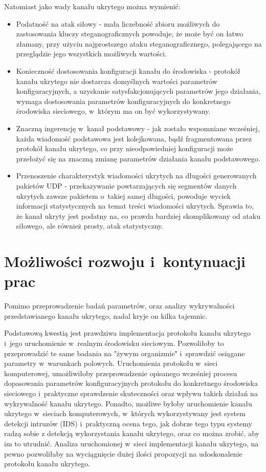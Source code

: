 \documentclass[a4paper, twoside, 12pt]{report}
\begin{document}
    Natomiast jako wady kanału ukrytego można wymienić:
    \begin{itemize}
        \item Podatność na atak siłowy - mała liczebność zbioru możliwych do zastosowania
            kluczy steganograficznych powoduje, że może być on łatwo złamany,
            przy użyciu najprostszego ataku steganograficznego, polegającego
            na przeglądzie jego wszystkich możliwych wartości.
        \item Konieczność dostosowania konfiguracji kanału do środowiska - protokół
            kanału ukrytego nie dostarcza domyślnych wartości parametrów konfiguracyjnych, a
            uzyskanie satysfakcjonujących parametrów jego działania, wymaga dostosowania
            parametrów konfiguracyjnych do konkretnego środowiska sieciowego,
            w~którym ma on być wykorzystywany.
        \item Znaczną ingerencję w~kanał podstawowy - jak zostało wspomniane wcześniej,
            każda wiadomość podstawowa jest kolejkowana, bądź fragmentowana przez
            protokół kanału ukrytego, co przy nieodpowiedniej konfiguracji może
            przełożyć się na znaczną zmianę parametrów działania kanału podstawowego.
        \item Przenoszenie charakterystyk wiadomości ukrytych na długości generowanych pakietów UDP -
            przekazywanie powtarzających się segmentów danych ukrytych
            zawsze pakietem o~takiej samej długości, powoduje wyciek informacji
            statystycznych na temat treści wiadomości ukrytych. Sprawia to, że
            kanał ukryty jest podatny na, co prawda bardziej skomplikowany od ataku siłowego,
            ale również prosty, atak statystyczny.

    \end{itemize}
\chapter{Możliwości rozwoju i~kontynuacji prac}
    Pomimo przeprowadzenie badań parametrów, oraz analizy wykrywalności przedstawianego kanału
    ukrytego, nadal kryje on kilka tajemnic.

    Podstawową kwestią jest prawdziwa implementacja protokołu kanału ukrytego
    i~jego uruchomienie w~realnym środowisku sieciowym. Pozwoliłoby to przeprowadzić
    te same badania na "żywym organizmie" i~sprawdzić osiągane parametry w~warunkach polowych.
    Uruchomienia protokołu w~sieci komputerowej, umożliwiłoby przeprowadzenie opisanego
    wcześniej procesu dopasowania parametrów konfiguracyjnych protokołu do konkretnego
    środowiska sieciowego i~praktyczne sprawdzenie skuteczności oraz wpływu takich
    działań na wykrywalność kanału ukrytego. Ponadto, możliwe byłoby uruchomienie
    kanału ukrytego w~sieciach komputerowych, w~których wykorzystywany jest system
    detekcji intruzów (IDS) i~praktyczną ocena tego, jak dobrze tego typu systemy
    radzą sobie z detekcją wykorzystania kanału ukrytego, oraz co można zrobić,
    aby im to utrudnić. Analiza uruchomionej w~sieci implementacji kanału ukrytego,
    na pewno pozwoliłaby na wyciągnięcie dużej ilości propozycji na udoskonalenie
    protokołu kanału ukrytego.
\end{document}
